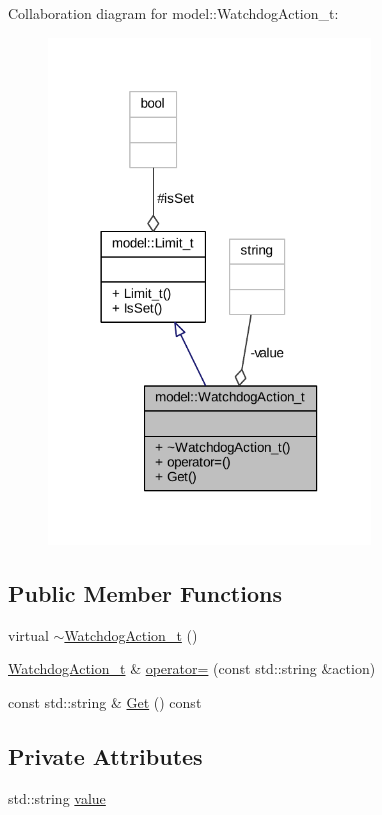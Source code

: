 Collaboration diagram for model\+:\+:Watchdog\+Action\+\_\+t\+:
\nopagebreak
\begin{figure}[H]
\begin{center}
\leavevmode
\includegraphics[width=242pt]{classmodel_1_1_watchdog_action__t__coll__graph}
\end{center}
\end{figure}
\subsection*{Public Member Functions}
\begin{DoxyCompactItemize}
\item 
virtual \hyperlink{classmodel_1_1_watchdog_action__t_ad7ab44276b924cf04382f47ee0ffa669}{$\sim$\+Watchdog\+Action\+\_\+t} ()
\item 
\hyperlink{classmodel_1_1_watchdog_action__t}{Watchdog\+Action\+\_\+t} \& \hyperlink{classmodel_1_1_watchdog_action__t_a7286318bc5ed1a3c174c1dca0d83dd85}{operator=} (const std\+::string \&action)
\item 
const std\+::string \& \hyperlink{classmodel_1_1_watchdog_action__t_a1f740519847ceab6351f2fe3c3b237da}{Get} () const 
\end{DoxyCompactItemize}
\subsection*{Private Attributes}
\begin{DoxyCompactItemize}
\item 
std\+::string \hyperlink{classmodel_1_1_watchdog_action__t_a232ddef47612be107b7436739f48aa29}{value}
\end{DoxyCompactItemize}
